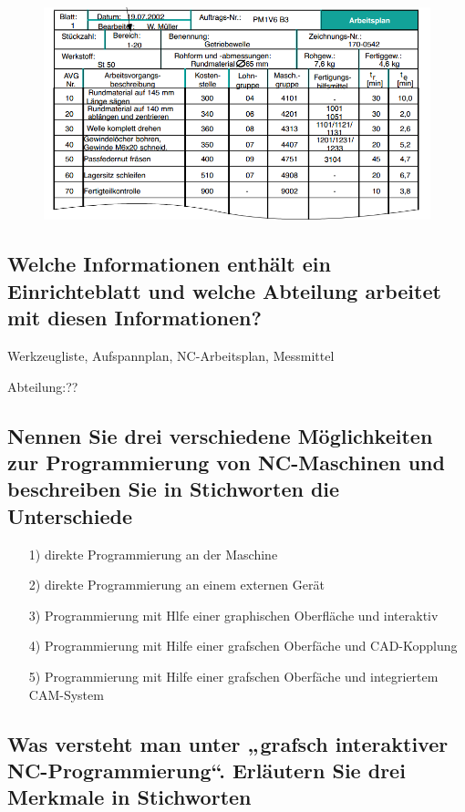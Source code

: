 \begin{figure}[h]
\centering
\includegraphics[scale=0.7]{Bild2_3.png}
\end{figure}


\subsection*{Welche Informationen enthält ein Einrichteblatt und welche Abteilung arbeitet mit diesen Informationen?}

Werkzeugliste, Aufspannplan, NC-Arbeitsplan, Messmittel

Abteilung:??


\subsection*{Nennen Sie drei verschiedene Möglichkeiten zur Programmierung von NC-Maschinen und beschreiben Sie in Stichworten die Unterschiede}


\begin{itemize}
\item[1)] direkte Programmierung an der Maschine
\item[2)] direkte Programmierung an einem externen Gerät
\item[3)] Programmierung mit Hlfe einer graphischen Oberfläche und interaktiv
\item[4)] Programmierung mit Hilfe einer grafschen Oberfäche und CAD-Kopplung
\item[5)] Programmierung mit Hilfe einer grafschen Oberfäche und integriertem CAM-System
\end{itemize}


\subsection*{Was versteht man unter „grafsch interaktiver NC-Programmierung“. Erläutern Sie drei Merkmale in Stichworten}


